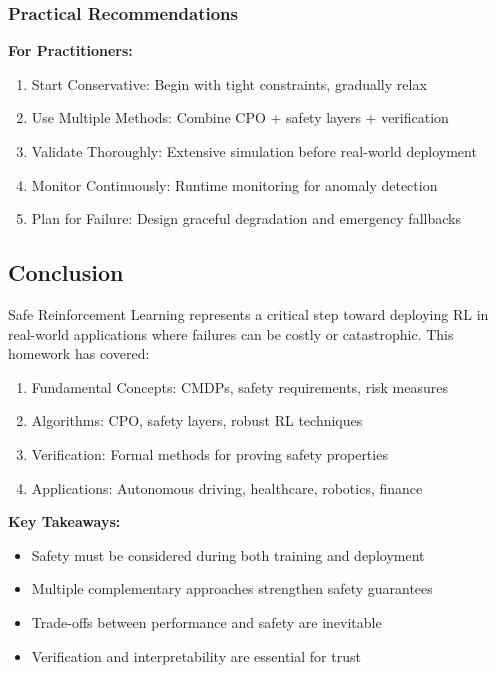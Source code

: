\documentclass[12pt]{article}
\begin{document}
{{{{\subsubsection{Practical Recommendations}

\textbf{For Practitioners:}
\begin{enumerate}
\item Start Conservative: Begin with tight constraints, gradually relax
\item Use Multiple Methods: Combine CPO + safety layers + verification
\item Validate Thoroughly: Extensive simulation before real-world deployment
\item Monitor Continuously: Runtime monitoring for anomaly detection
\item Plan for Failure: Design graceful degradation and emergency fallbacks
\end{enumerate}

\subsection{Conclusion}

Safe Reinforcement Learning represents a critical step toward deploying RL in real-world applications where failures can be costly or catastrophic. This homework has covered:

\begin{enumerate}
\item Fundamental Concepts: CMDPs, safety requirements, risk measures
\item Algorithms: CPO, safety layers, robust RL techniques
\item Verification: Formal methods for proving safety properties
\item Applications: Autonomous driving, healthcare, robotics, finance
\end{enumerate}

\textbf{Key Takeaways:}
\begin{itemize}
\item Safety must be considered during both training and deployment
\item Multiple complementary approaches strengthen safety guarantees
\item Trade-offs between performance and safety are inevitable
\item Verification and interpretability are essential for trust
\end{itemize}

}}}}
\end{document}
